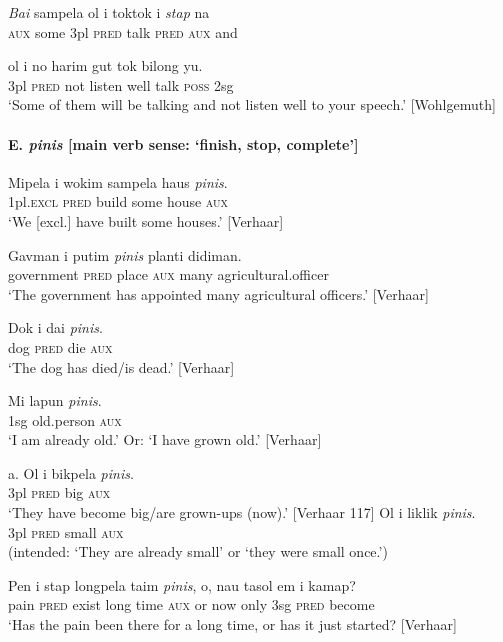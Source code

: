 \ea \gll  \textit{Bai}  sampela  ol  i  toktok  i \textit{stap}  na\\
\textsc{aux}  some  3pl  \textsc{pred}  talk  \textsc{pred}  \textsc{aux}  and\\
\z

\ea
 \gll  ol  i  no  harim  gut  tok  bilong  yu.\\
3pl  \textsc{pred}  not  listen  well  talk  \textsc{poss}  2sg\\
\glt ‘Some of them will be talking and not listen well to your speech.’ [Wohlgemuth]
\z

\paragraph{E. \textit{pinis}  [main verb sense: ‘finish, stop, complete’]}
\ea
\gll  Mipela  i  wokim  sampela  haus  \textit{pinis}.\\
1pl.\textsc{excl}  \textsc{pred}  build  some  house  \textsc{aux}\\
\glt ‘We [excl.] have built some houses.’  [Verhaar]
\z

\ea
\gll  Gavman  i  putim  \textit{pinis}  planti  didiman.\\
government  \textsc{pred} place  \textsc{aux}  many  agricultural.officer\\
\glt ‘The government has appointed many agricultural officers.’  [Verhaar]
\z

\ea
\gll  Dok  i  dai  \textit{pinis}.\\
dog  \textsc{pred}  die  \textsc{aux}\\
\glt ‘The dog has died/is dead.’  [Verhaar]
\z

\ea
\gll  Mi  lapun  \textit{pinis}.\\
1sg  old.person  \textsc{aux}\\
\glt ‘I am already old.’ Or: ‘I have grown old.’  [Verhaar]
\z

\ea \ea
\gll a. Ol  i  bikpela  \textit{pinis}.\\
3pl  \textsc{pred}  big  \textsc{aux}\\
\glt ‘They have become big/are grown-ups (now).’  [Verhaar 117]
\ex \gll  *Ol  i  liklik  \textit{pinis}.\\
 3pl  \textsc{pred}  small  \textsc{aux}\\
\glt (intended: ‘They are already small’ or ‘they were small once.’)
\z \z

\ea
\gll Pen  i  stap  longpela  taim  \textit{pinis},  o,  nau  tasol  em  i  kamap?\\
pain  \textsc{pred}  exist  long  time  \textsc{aux}  or  now  only  3sg  \textsc{pred}  become\\
\glt ‘Has the pain been there for a long time, or has it just started?  [Verhaar]
\z

